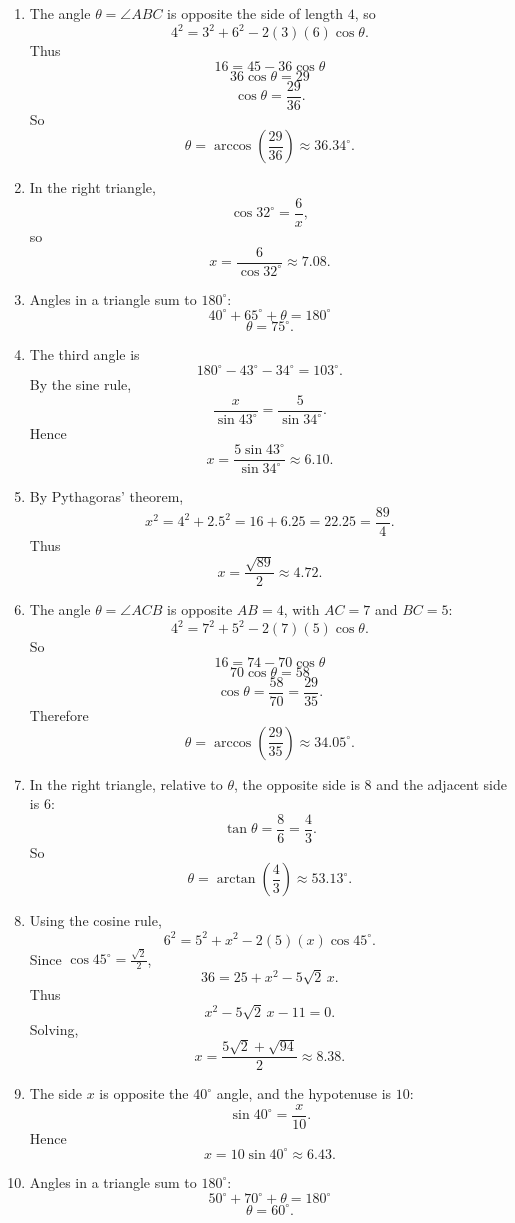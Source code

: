 \documentclass[11pt,a4paper]{article}
\begin{document}
\begin{enumerate}
\item %
The angle \(\theta=\angle ABC\) is opposite the side of length \(4\), so
\[
4^2=3^2+6^2-2(3)(6)\cos\theta.
\]
Thus
\[
16=45-36\cos\theta
\]
\[
36\cos\theta=29
\]
\[
\cos\theta=\frac{29}{36}.
\]
So
\[
\theta=\arccos\left(\frac{29}{36}\right)\approx 36.34^\circ.
\]

\item %
In the right triangle,
\[
\cos 32^\circ=\frac{6}{x},
\]
so
\[
x=\frac{6}{\cos 32^\circ}\approx 7.08.
\]

\item %
Angles in a triangle sum to \(180^\circ\):
\[
40^\circ+65^\circ+\theta=180^\circ
\]
\[
\theta=75^\circ.
\]

\item %
The third angle is
\[
180^\circ-43^\circ-34^\circ=103^\circ.
\]
By the sine rule,
\[
\frac{x}{\sin 43^\circ}=\frac{5}{\sin 34^\circ}.
\]
Hence
\[
x=\frac{5\sin 43^\circ}{\sin 34^\circ}\approx 6.10.
\]

\item %
By Pythagoras' theorem,
\[
x^2=4^2+2.5^2=16+6.25=22.25=\frac{89}{4}.
\]
Thus
\[
x=\frac{\sqrt{89}}{2}\approx 4.72.
\]

\item %
The angle \(\theta=\angle ACB\) is opposite \(AB=4\), with \(AC=7\) and \(BC=5\):
\[
4^2=7^2+5^2-2(7)(5)\cos\theta.
\]
So
\[
16=74-70\cos\theta
\]
\[
70\cos\theta=58
\]
\[
\cos\theta=\frac{58}{70}=\frac{29}{35}.
\]
Therefore
\[
\theta=\arccos\left(\frac{29}{35}\right)\approx 34.05^\circ.
\]

\item %
In the right triangle, relative to \(\theta\), the opposite side is \(8\) and the adjacent side is \(6\):
\[
\tan\theta=\frac{8}{6}=\frac{4}{3}.
\]
So
\[
\theta=\arctan\left(\frac{4}{3}\right)\approx 53.13^\circ.
\]

\item %
Using the cosine rule,
\[
6^2=5^2+x^2-2(5)(x)\cos 45^\circ.
\]
Since \(\cos 45^\circ=\frac{\sqrt2}{2}\),
\[
36=25+x^2-5\sqrt2\,x.
\]
Thus
\[
x^2-5\sqrt2\,x-11=0.
\]
Solving,
\[
x=\frac{5\sqrt2+\sqrt{94}}{2}\approx 8.38.
\]

\item %
The side \(x\) is opposite the \(40^\circ\) angle, and the hypotenuse is \(10\):
\[
\sin 40^\circ=\frac{x}{10}.
\]
Hence
\[
x=10\sin 40^\circ\approx 6.43.
\]

\item %
Angles in a triangle sum to \(180^\circ\):
\[
50^\circ+70^\circ+\theta=180^\circ
\]
\[
\theta=60^\circ.
\]

\end{enumerate}
\end{document}
